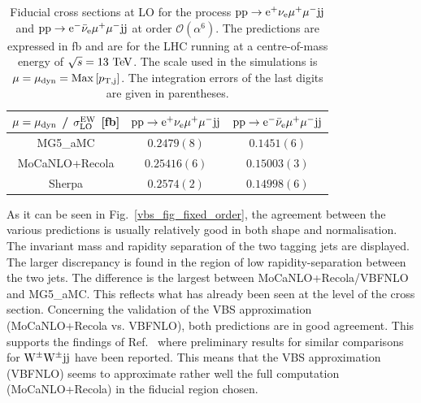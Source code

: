\documentclass[11pt]{cernrep}
\begin{document}
\begin{table}
\begin{center} 
\begin{tabular}{ c | c | c }
 $\mu = \mu_{\rm dyn}$ / $\sigma_{\rm LO}^{\rm EW}$ [fb] & ${\rm p} {\rm p} \to {\rm e}^+  \nu_{\rm e}  \mu^+ \mu^- {\rm j} {\rm j}$  & ${\rm p} {\rm p} \to {\rm e}^-  \bar \nu_{\rm e}  \mu^+ \mu^- {\rm j} {\rm j}$  \\
  \hline\hline
  {\sc MG5\_aMC}                  & $0.2479(8)$  & $0.1451(6)$   \\
  {\sc MoCaNLO}+{\sc Recola}      & $0.25416(6)$  & $0.15003(3)$  \\
{\sc Sherpa}                      & $0.2574(2)$  & $0.14998(6)$   \\
  \hline
\end{tabular}
\end{center}
\caption{
Fiducial cross sections at LO for the process ${\rm p}{\rm p}\to{\rm e}^+\nu_{\rm e}\mu^+\mu^-{\rm j}{\rm j}$ and ${\rm p}{\rm p}\to{\rm e}^-\bar\nu_{\rm e}\mu^+\mu^-{\rm j}{\rm j}$ at order $\mathcal{O} (\alpha^6)$.
The predictions are expressed in fb and are for the LHC running at a centre-of-mass energy of $\sqrt{s}=13 {\rm~TeV}$.
The scale used in the simulations is $\mu = \mu_{\rm dyn} = {\rm Max}\left[p_{\rm T, j}\right]$.
The integration errors of the last digits are given in parentheses.}
\label{table:xsectLOdyn}
\end{table}

As it can be seen in Fig.~\ref{vbs_fig_fixed_order}, the agreement between the various predictions is usually relatively good in both shape and normalisation.
The invariant mass and rapidity separation of the two tagging jets are displayed.
The larger discrepancy is found in the region of low rapidity-separation between the two jets.
The difference is the largest between {\sc MoCaNLO}+{\sc Recola}/{\sc VBFNLO} and {\sc MG5\_aMC}.
This reflects what has already been seen at the level of the cross section. 
Concerning the validation of the VBS approximation ({\sc MoCaNLO}+{\sc Recola} vs. {\sc VBFNLO}), both predictions are in good agreement.
This supports the findings of Ref.~\cite{Anders:2018gfr} where preliminary results for similar comparisons for ${\rm W}^\pm{\rm W}^\pm{\rm j}{\rm j}$ have been reported.
This means that the VBS approximation ({\sc VBFNLO}) seems to approximate rather well the full computation ({\sc MoCaNLO}+{\sc Recola}) in the fiducial region chosen.
\end{document}
